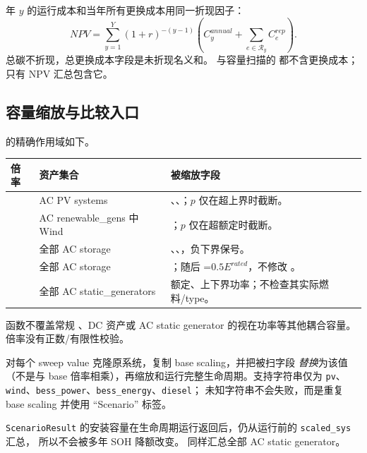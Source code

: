 年 $y$ 的运行成本和当年所有更换成本用同一折现因子：
\begin{equation}
 NPV=\sum_{y=1}^{Y}(1+r)^{-(y-1)}
 \left(C_y^{annual}+\sum_{e\in\mathcal R_y}C_e^{rep}\right).
\end{equation}
总碳不折现，总更换成本字段是未折现名义和。 与容量扫描的
 都不含更换成本；只有 NPV 汇总包含它。

\subsection{容量缩放与比较入口}
 的精确作用域如下。
\begin{longtable}{@{}L{3.3cm}L{3.3cm}L{7.0cm}@{}}
\toprule
倍率 & 资产集合 & 被缩放字段\\ \midrule
{} & AC PV systems & 、、；$p$ 仅在超上界时截断。\\
 & AC renewable\_gens 中 Wind & ；$p$ 仅在超额定时截断。\\
 & 全部 AC storage & 、、，负下界保号。\\
 & 全部 AC storage & ；随后 =$0.5E^{rated}$，不修改 。\\
 & 全部 AC static\_generators & 额定、上下界功率；不检查其实际燃料/type。\\
\bottomrule
\end{longtable}
函数不覆盖常规 、DC 资产或 AC static generator 的视在功率等其他耦合容量。
倍率没有正数/有限性校验。

 对每个 sweep value 克隆原系统，复制 base scaling，并把被扫字段
\emph{替换}为该值（不是与 base 倍率相乘），再缩放和运行完整生命周期。支持字符串仅为
\texttt{pv}、\texttt{wind}、\texttt{bess\_power}、\texttt{bess\_energy}、\texttt{diesel}；
未知字符串不会失败，而是重复 base scaling 并使用 ``Scenario'' 标签。

\texttt{ScenarioResult} 的安装容量在生命周期运行返回后，仍从运行前的 \texttt{scaled\_sys} 汇总，
所以不会被多年 SOH 降额改变。 同样汇总全部 AC static generator。


